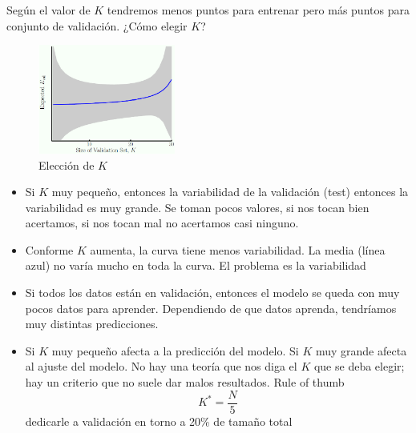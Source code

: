 \documentclass[11pt,a4paper]{article}
\theoremstyle{definition}
\begin{document}
	Según el valor de $K$ tendremos menos puntos para entrenar pero más puntos para conjunto de validación. ¿Cómo elegir $K$?
	\begin{figure}[H]
		\centering
		\includegraphics[width=0.4\textwidth]{images/choosing_k}
		\caption{Elección de $K$}
	\end{figure}
	\begin{itemize}
		\item Si $K$ muy pequeño, entonces la variabilidad de la validación (test) entonces la variabilidad es muy grande. Se toman pocos valores, si nos tocan bien acertamos, si nos tocan mal no acertamos casi ninguno.
		\item Conforme $K$ aumenta, la curva tiene menos variabilidad. La media (línea azul) no varía mucho en toda la curva. El problema es la variabilidad
		\item Si todos los datos están en validación, entonces el modelo se queda con muy pocos datos para aprender. Dependiendo de que datos aprenda, tendríamos muy distintas predicciones.
		\item Si $K$ muy pequeño afecta a la predicción del modelo. Si $K$ muy grande afecta al ajuste del modelo. No hay una teoría que nos diga el $K$ que se deba elegir; hay un criterio que no suele dar malos resultados. Rule of thumb $$K^*=\frac{N}{5}$$ dedicarle a validación en torno a 20\% de tamaño total
	\end{itemize}
	
\end{document}
